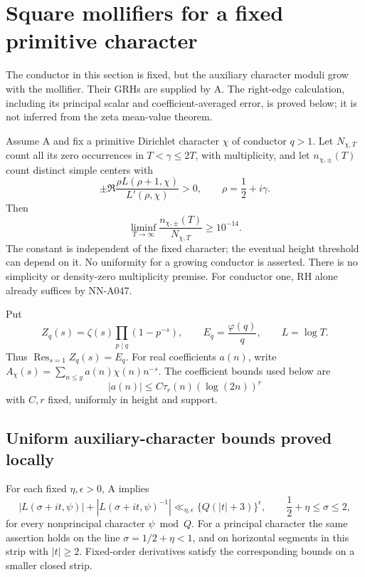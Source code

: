 \section{Square mollifiers for a fixed primitive character}
\label{sec:A048-fixed-character-square}

The conductor in this section is fixed, but the auxiliary
character moduli grow with the mollifier. Their GRHs are
supplied by A. The right-edge calculation, including its
principal scalar and coefficient-averaged error, is proved
below; it is not inferred from the zeta mean-value theorem.

\begin{theorem}
\label{thm:A048-signs}
Assume A and fix a primitive Dirichlet character \(\chi\)
of conductor \(q>1\). Let \(N_{\chi,T}\) count all its
zero occurrences in \(T<\gamma\le2T\), with multiplicity,
and let \(n_{\chi,\pm}(T)\) count distinct simple centers with
\[
 \pm\Re\frac{\rho L(\rho+1,\chi)}{L'(\rho,\chi)}>0,
       \qquad \rho=\frac12+i\gamma.
\]
Then
\[
 \liminf_{T\to\infty}
       \frac{n_{\chi,\pm}(T)}{N_{\chi,T}}\ge10^{-14}.
\]
The constant is independent of the fixed character; the
eventual height threshold can depend on it. No uniformity
for a growing conductor is asserted. There is no simplicity
or density-zero multiplicity premise. For conductor one,
RH alone already suffices by NN-A047.
\end{theorem}

Put
\[
 Z_q(s)=\zeta(s)\prod_{p\mid q}(1-p^{-s}),\qquad
 E_q=\frac{\varphi(q)}q,\qquad L=\log T.
\]
Thus \(\operatorname{Res}_{s=1}Z_q(s)=E_q\).
For real coefficients \(a(n)\), write
\(A_\chi(s)=\sum_{n\le y}a(n)\chi(n)n^{-s}\).
The coefficient bounds used below are
\begin{equation}\label{eq:A048-coeff}
 |a(n)|\le C\tau_r(n)(\log(2n))^r
\end{equation}
with \(C,r\) fixed, uniformly in height and support.

\subsection*{Uniform auxiliary-character bounds proved locally}

\begin{lemma}
\label{lem:A048-uniform-growth}
For each fixed \(\eta,\epsilon>0\), A implies
\begin{equation}\label{eq:A048-uniform-growth}
 |L(\sigma+it,\psi)|+|L(\sigma+it,\psi)^{-1}|
 \ll_{\eta,\epsilon}\{Q(|t|+3)\}^{\epsilon},
 \qquad \frac12+\eta\le\sigma\le2,
\end{equation}
for every nonprincipal character \(\psi\bmod Q\).
For a principal character the same assertion holds on
the line \(\sigma=1/2+\eta<1\), and on horizontal
segments in this strip with \(|t|\ge2\).
Fixed-order derivatives satisfy the corresponding bounds
on a smaller closed strip.
\end{lemma}

